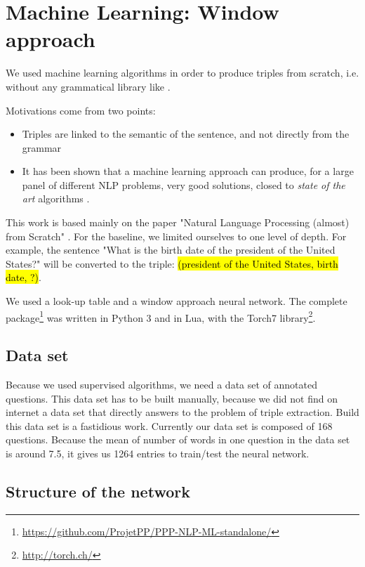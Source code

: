 \section{Machine Learning: Window approach}


We used machine learning algorithms in order to produce triples from scratch, i.e. without any grammatical library like \Stanford.

Motivations come from two points:
\begin{itemize}
\item Triples are linked to the semantic of the sentence, and not directly from the grammar
\item It has been shown that a machine learning approach can produce, for a large panel of different NLP problems, very good solutions, closed to \textit{state of the art} algorithms \cite{collobert}.
\end{itemize}

This work is based mainly on the paper "Natural Language Processing (almost) from Scratch" \cite{collobert}.
For the baseline, we limited ourselves to one level of depth.
For example, the sentence "What is the birth date of the president of the United States?" will be converted to the triple: 
\hl{(president of the United States, birth date, ?)}. 

We used a look-up table and a window approach neural network. The complete package\footnote{\url{https://github.com/ProjetPP/PPP-NLP-ML-standalone/}} was written in Python 3 and in Lua, with the Torch7 library\footnote{\url{http://torch.ch/}}.

\subsection{Data set}

Because we used supervised algorithms, we need a data set of annotated questions.
This data set has to be built manually, because we did not find on internet a data set that directly answers to the problem of triple extraction.
Build this data set is a fastidious work. Currently our data set is composed of 168 questions.
Because the mean of number of words in one question in the data set is around 7.5, it gives us 1264 entries to train/test the neural network.

\subsection{Structure of the network}


